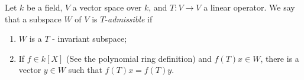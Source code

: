 \documentclass[12pt]{article}
\begin{document}
Let $k$ be a field, $V$ a vector space over $k$, and $T\colon V\to V$ a linear operator. We say that a subspace $W$ of $V$ is $T$-\emph{admissible} if
\begin{enumerate}
\item $W$ is a $T$ - invariant subspace;
\item If $f \in k[X]$ (See the polynomial ring definition) and $f(T)x \in W$, there is a vector $y \in W$ such that $f(T)x=f(T)y$.
\end{enumerate}
\end{document}
